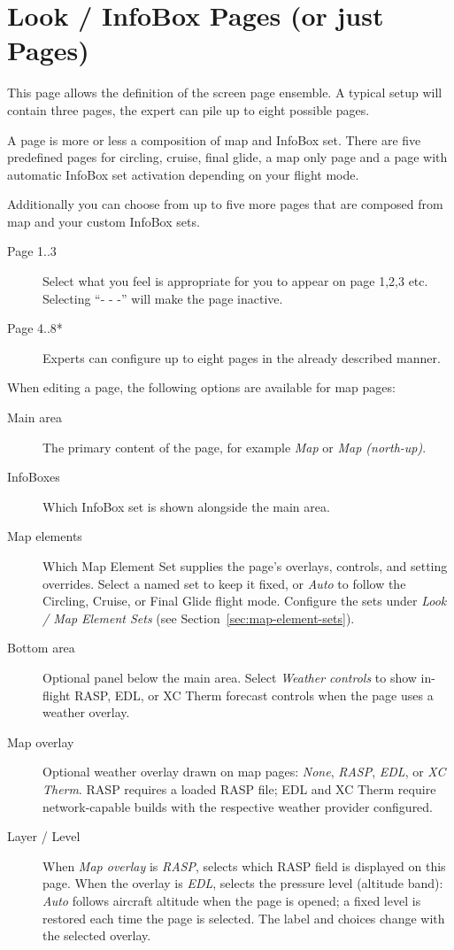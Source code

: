 \section{Look / InfoBox Pages (or just Pages)}\label{conf:screenpages}

This page allows the definition of the screen page ensemble. A typical setup 
will contain three pages, the expert can pile up to eight possible pages.

A page is more or less a composition of map and InfoBox set. There are five 
predefined pages for circling, cruise, final glide, a map only page and a 
page with automatic InfoBox set activation depending on your flight mode.

Additionally you can choose from up to five more pages that are composed from map 
and your custom InfoBox sets.  

\begin{description}
\item[Page 1..3]  Select what you feel is appropriate for you to appear on page 1,2,3 etc. 
  Selecting ``- - -'' will make the page inactive.
\item[Page 4..8*]  Experts can configure up to eight pages in the already 
  described manner.
\end{description}

When editing a page, the following options are available for map pages:
\begin{description}
\item[Main area]  The primary content of the page, for example \emph{Map}
  or \emph{Map (north-up)}.
\item[InfoBoxes]  Which InfoBox set is shown alongside the main area.
\item[Map elements]  Which Map Element Set supplies the page's overlays,
  controls, and setting overrides.  Select a named set to keep it fixed, or
  \emph{Auto} to follow the Circling, Cruise, or Final Glide flight mode.
  Configure the sets under \emph{Look / Map Element Sets} (see
  Section~\ref{sec:map-element-sets}).
\item[Bottom area]  Optional panel below the main area.  Select
  \emph{Weather controls} to show in-flight RASP, EDL, or XC Therm forecast
  controls when the page uses a weather overlay.
\item[Map overlay]  Optional weather overlay drawn on map pages: \emph{None},
  \emph{RASP}, \emph{EDL}, or \emph{XC Therm}.  RASP requires a loaded RASP
  file; EDL and XC Therm require network-capable builds with the respective
  weather provider configured.
\item[Layer / Level]  When \emph{Map overlay} is \emph{RASP}, selects
  which RASP field is displayed on this page.  When the overlay is
  \emph{EDL}, selects the pressure level (altitude band): \emph{Auto}
  follows aircraft altitude when the page is opened; a fixed level is
  restored each time the page is selected.  The label and choices
  change with the selected overlay.
\end{description}


